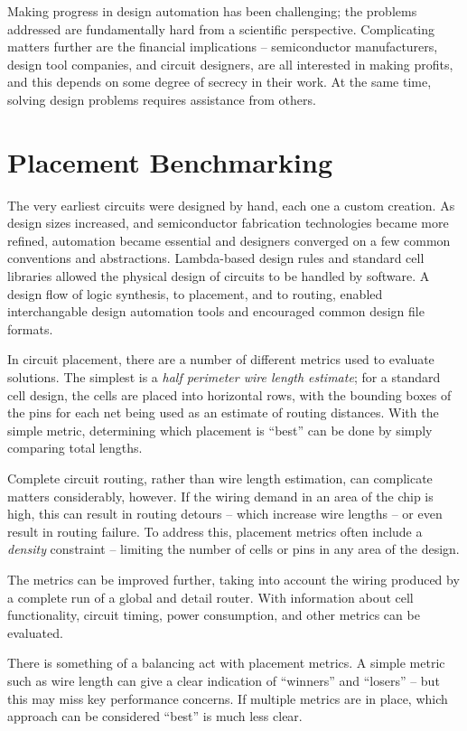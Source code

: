 \documentclass[sigconf]{acmart}
\begin{document}
Making progress in design automation has been challenging;
the problems addressed are fundamentally hard from a scientific
perspective. Complicating matters further are the financial
implications -- semiconductor manufacturers, design tool companies,
and circuit designers, are all interested in making profits, and
this depends on some degree of secrecy in their work.  At the
same time, solving design problems requires assistance from
others.
\fi


\section{Placement Benchmarking}

The very earliest circuits were designed by hand, each one a custom
creation. As design sizes increased, and semiconductor fabrication
technologies became more refined, automation became essential and
designers converged on a few common conventions and
abstractions. Lambda-based design rules and standard cell
libraries\cite{Mead93} allowed the physical design of circuits to be
handled by software.  A design flow of logic synthesis, to placement,
and to routing, enabled interchangable design automation tools and
encouraged common design file formats.

In circuit placement, there are a number of different metrics
used to evaluate solutions.  The simplest is a {\em half perimeter
  wire length estimate}; for a standard cell design, the
cells are placed into horizontal rows, with the bounding boxes
of the pins for each net being used as an estimate of routing
distances.  With the simple metric, determining which placement
is ``best'' can be done by simply comparing total lengths.

Complete circuit routing, rather than
wire length estimation, can complicate matters considerably, however.
If the wiring demand in an area of the chip is high, this can
result in routing detours -- which increase wire lengths -- or
even result in routing failure.  To address this, placement
metrics often include a {\em density} constraint -- limiting the
number of cells or pins in any area of the design.

The metrics can be improved further, taking into account the
wiring produced by a complete run of a global and detail router.
With information about cell functionality, circuit timing, power
consumption, and other metrics can be evaluated.

There is something of a balancing act with placement metrics.
A simple metric such as wire length can give a clear indication
of ``winners'' and ``losers'' -- but this may miss key performance
concerns.  If multiple metrics are in place, which approach
can be considered ``best'' is much less clear.
\end{document}
